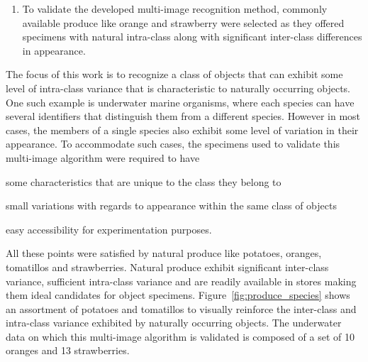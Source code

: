 \documentclass {udthesis}
\begin{document}
\begin{enumerate}
	\item To validate the developed multi-image recognition method, commonly available produce like orange and strawberry were selected as they offered specimens with natural intra-class along with significant inter-class differences in appearance.
\end{enumerate}


The focus of this work is to recognize a class of objects that can exhibit some level of intra-class variance that is characteristic to naturally occurring objects. One such example is underwater marine organisms, where each species can have several identifiers that distinguish them from a different species. However in most cases, the members of a single species also exhibit some level of variation in their appearance. To accommodate such cases, the specimens used to validate this multi-image algorithm were required to have \begin{enumerate*}[label=(a)]  \item some characteristics that are unique to the class they belong to \item small variations with regards to appearance within the same class of objects \item easy accessibility for experimentation purposes. \end{enumerate*} All these points were satisfied by natural produce like potatoes, oranges, tomatillos and strawberries. Natural produce exhibit significant inter-class variance, sufficient intra-class variance and are readily available in stores making them ideal 
candidates for object specimens. Figure~\ref{fig:produce_species} shows an assortment of potatoes and tomatillos to visually reinforce the inter-class and intra-class variance exhibited by naturally occurring objects. The underwater data on which this multi-image algorithm is validated is composed of a set of 10 oranges and 13 strawberries.
%
\end{document}
